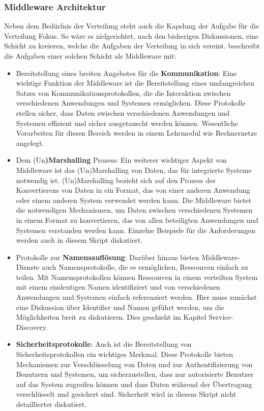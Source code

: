 \subsubsection{Middleware Architektur}
Neben dem Bedürfnis der Verteilung steht auch die Kapslung der Aufgabe für die Verteilung Fokus. So wäre es zielgerichtet, nach den bisherigen Diskussionen, eine Schicht zu kreieren, welche die Aufgaben der Verteilung in sich vereint.
\cite{tanenbaum2017distributed} beschreibt die Aufgaben einer solchen Schicht als Middleware mit:
\begin{itemize}
\item Bereitstellung eines breiten Angebotes für die \textbf{Kommunikation}: 
Eine wichtige Funktion der Middleware ist die Bereitstellung eines umfangreichen Satzes von Kommunikationsprotokollen, die die Interaktion zwischen verschiedenen Anwendungen und Systemen ermöglichen. Diese Protokolle stellen sicher, dass Daten zwischen verschiedenen Anwendungen und Systemen effizient und sicher ausgetauscht werden können. Wesentliche Vorarbeiten für diesen Bereich werden in einem Lehrmodul wie Rechnernetze angelegt.
\item Dem (Un\textbf{)Marshalling} Prozess: Ein weiterer wichtiger Aspekt von Middleware ist das (Un)Marshalling von Daten, das für integrierte Systeme notwendig ist. (Un)Marshalling bezieht sich auf den Prozess des Konvertierens von Daten in ein Format, das von einer anderen Anwendung oder einem anderen System verwendet werden kann. Die Middleware bietet die notwendigen Mechanismen, um Daten zwischen verschiedenen Systemen in einem Format zu konvertieren, das von allen beteiligten Anwendungen und Systemen verstanden werden kann. Einzelne Beispiele für die Anforderungen werden auch in diesem Skript diskutiert. 
\item Protokolle zur \textbf{Namensauflösung}: Darüber hinaus bieten Middleware-Dienste auch Namensprotokolle, die es ermöglichen, Ressourcen einfach zu teilen. Mit Namensprotokollen können Ressourcen in einem verteilten System mit einem eindeutigen Namen identifiziert und von verschiedenen Anwendungen und Systemen einfach referenziert werden. Hier muss zunächst eine Diskussion über Identifier und Namen geführt werden, um die Möglichkeiten breit zu diskutieren. Dies geschieht im Kapitel Service-Discovery.
\item \textbf{Sicherheitsprotokolle}: Auch ist die Bereitstellung von Sicherheitsprotokollen ein wichtiges Merkmal. Diese Protokolle bieten Mechanismen zur Verschlüsselung von Daten und zur Authentifizierung von Benutzern und Systemen, um sicherzustellen, dass nur autorisierte Benutzer auf das System zugreifen können und dass Daten während der Übertragung verschlüsselt und gesichert sind. Sicherheit wird in diesem Skript nicht detaillierter diskutiert.

\end{itemize}
